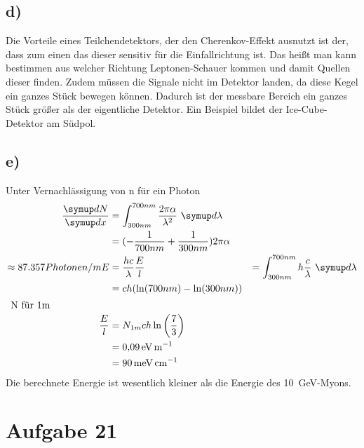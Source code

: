 \subsection{d)}
Die Vorteile eines Teilchendetektors, der den Cherenkov-Effekt ausnutzt ist der, dass
zum einen das dieser sensitiv für die Einfallrichtung ist. Das heißt man kann
bestimmen aus welcher Richtung Leptonen-Schauer kommen und damit Quellen dieser finden.
Zudem müssen die Signale nicht im Detektor landen, da diese Kegel ein ganzes Stück bewegen können. 
Dadurch ist der messbare Bereich ein ganzes Stück größer als der eigentliche Detektor.
Ein Beispiel bildet der Ice-Cube-Detektor am Südpol.

\subsection{e)}
Unter Vernachlässigung von n für ein Photon
\begin{align}
    \frac{\dif{N}}{\dif{x}} &= \int_{300nm}^{700nm} \frac{2 \pi \alpha}{\lambda^2} \,\dif{\lambda}\\
    &= (-\frac{1}{700nm}+\frac{1}{300nm}) 2 \pi \alpha \\
    \approx 87.357 Photonen/m
    E&=\frac{hc}{\lambda}
    \frac{E}{l} &= \int_{300nm}^{700nm} h \frac{c}{\lambda} \,\dif{\lambda}\\
    &= ch(\ln (700nm)-\ln(300nm) )\\
    \intertext{
        N für 1m
    }
    \frac{E}{l} &= N_{1m} ch \ln \left(\frac{7}{3} \right)\\
    &= \SI{0.09}{\electronvolt\per\meter}\\
    &= \SI{90}{\milli\electronvolt\per\centi\meter}
\end{align}
Die berechnete Energie ist wesentlich kleiner als die Energie des \SI{10}{\giga\electronvolt}-Myons.


\section{Aufgabe 21}

